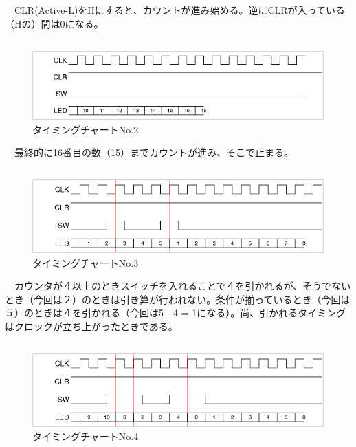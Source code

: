 \documentclass{scrartcl}
\begin{document}
　CLR(Active-L)をHにすると、カウントが進み始める。逆にCLRが入っている（Hの）間は0になる。\\

\subsection{}
\label{sec:orgc7ae8c5}
\begin{figure}[htbp]
\centering
\includegraphics[width=.9\linewidth]{./logic-2.png}
\caption{\label{fig:org8ba8ba5}
タイミングチャートNo.2}
\end{figure}


　最終的に16番目の数（15）までカウントが進み、そこで止まる。\\

\subsection{}
\label{sec:org5806b69}
\begin{figure}[htbp]
\centering
\includegraphics[width=.9\linewidth]{./logic-3.png}
\caption{\label{fig:org67a8d53}
タイミングチャートNo.3}
\end{figure}

　カウンタが４以上のときスイッチを入れることで４を引かれるが、そうでないとき（今回は２）のときは引き算が行われない。条件が揃っているとき（今回は５）のときは４を引かれる（今回は5 - 4 = 1になる）。尚、引かれるタイミングはクロックが立ち上がったときである。\\

\subsection{}
\label{sec:org82d769d}
\begin{figure}[htbp]
\centering
\includegraphics[width=.9\linewidth]{./logic-4.png}
\caption{\label{fig:org186077f}
タイミングチャートNo.4}
\end{figure}
　\\
\end{document}
